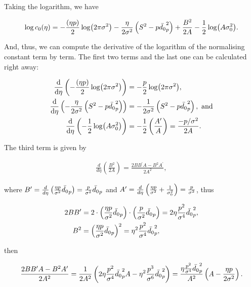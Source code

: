     Taking the logarithm, we have

    \begin{align*}
        \log c_0(\eta) &= -\dfrac{(\eta p)}{2}\log(2\pi\sigma^2) - \dfrac{\eta}{2\sigma^2}\left(S^2 - p\bar{d_0}_p^2\right) + \dfrac{B^2}{2A} - \dfrac{1}{2}\log(A\sigma_0^2). \\
    \end{align*}

    And, thus, we can compute the derivative of the logarithm of the normalising constant term by term. The first two terms and the last one can be calculated right away:

    \begin{align*}
        \dfrac{\dd}{\dd \eta}\left(-\dfrac{(\eta p)}{2}\log(2\pi\sigma^2)\right) &= -\dfrac{p}{2}\log(2\pi\sigma^2),\\
        \dfrac{\dd}{\dd \eta}\left(-\dfrac{\eta}{2\sigma^2}\left(S^2 - p\bar{d_0}_p^2\right)\right) &= -\dfrac{1}{2\sigma^2}\left(S^2 - p\bar{d_0}_p^2\right),  \text{ and} \\
        \dv{\eta} \left(- \dfrac{1}{2}\log(A\sigma_0^2)\right) &= -\dfrac{1}{2}\left(\frac{A^\prime}{A}\right) = \dfrac{-p/\sigma^2}{2A}.
    \end{align*}

    The third term is given by

    \begin{align*}
        \frac{d}{d\eta} \left( \frac{B^2}{2A} \right) = \frac{2BB^\prime A - B^2 A^\prime}{2A^2},
    \end{align*}

    where $B^\prime = \frac{d}{d\eta} \left( \frac{\eta p}{\sigma^2}\bar{d_0}_p \right) = \frac{p}{\sigma^2}\bar{d_0}_p$ and $A^\prime = \frac{d}{d\eta} \left( \frac{\eta p}{\sigma^2} + \frac{1}{\sigma_0^2} \right) = \frac{p}{\sigma^2}$, thus

    \begin{align*}
        2BB^\prime &= 2 \cdot \left( \frac{\eta p}{\sigma^2} \bar{d_0}_p \right) \cdot \left( \frac{p}{\sigma^2} \bar{d_0}_p \right) = 2\eta \frac{p^2}{\sigma^4} \bar{d_0}_p^2,\\
        B^2 &= \left( \frac{\eta p}{\sigma^2} \bar{d_0}_p \right)^2 = \eta^2 \frac{p^2}{\sigma^4} \bar{d_0}_p^2,
    \end{align*}

    then 

    \begin{equation*}
        \frac{2BB^\prime A - B^2A^\prime}{2A^2} = \frac{1}{2A^2} \left( 2\eta \frac{p^2}{\sigma^4} \bar{d_0}_p^2 A - \eta^2 \frac{p^3}{\sigma^6} \bar{d_0}_p^2 \right) = \dfrac{\eta \frac{p^2}{\sigma^4} \bar{d_0}_p^2}{A^2} \left( A - \frac{\eta p}{2\sigma^2} \right).
    \end{equation*}

